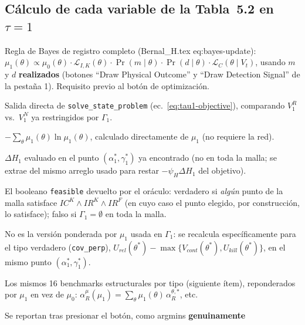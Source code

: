 \documentclass[ecta,nameyear,draft]{econsocart}
\newcommand{\pyvar}[1]{\texttt{#1}}
\begin{document}
\subsection{Cálculo de cada variable de la Tabla~5.2 en $\tau=1$}

\begin{description}[leftmargin=1.4cm, style=nextline]
\item[$\mu_1(\theta)$] Regla de Bayes de registro completo (Bernal\_H.tex eq:bayes-update):
$\mu_1(\theta)\propto\mu_0(\theta)\cdot\mathcal{L}_{I,K}(\theta)\cdot\Pr(m\mid\theta)\cdot\Pr(d\mid\theta)\cdot\mathcal{L}_{C}(\theta\mid V_t)$,
usando $m$ y $d$ \textbf{realizados} (botones ``Draw Physical Outcome'' y ``Draw Detection
Signal'' de la pestaña 1). Requisito previo al botón de optimización.\label{sec:bayes-mu1}
\item[$a_1^{S\ast},\ \alpha_1^\ast,\ \gamma_1^\ast$] Salida directa de \pyvar{solve\_state\_problem}
(ec.~\ref{eq:tau1-objective}), comparando $V_1^R$ vs.\ $V_1^N$ ya restringidos por $\Gamma_1$.
\item[$H(\mu_1)$] $-\sum_\theta\mu_1(\theta)\ln\mu_1(\theta)$, calculado directamente de $\mu_1$
(no requiere la red).
\item[$\Delta H$ Estado ($\tau=1$)] $\Delta H_1$ evaluado en el punto $(\alpha_1^\ast,\gamma_1^\ast)$
ya encontrado (no en toda la malla; se extrae del mismo arreglo usado para restar $-\psi_H\Delta H_1$
del objetivo).
\item[$\Gamma_t(\mu_t)$ bajo EV ($\tau=1$)] El booleano \pyvar{feasible} devuelto por el
oráculo: verdadero si \emph{algún} punto de la malla satisface $IC^K\wedge IR^K\wedge IR^F$
(en cuyo caso el punto elegido, por construcción, lo satisface); falso si $\Gamma_1=\emptyset$
en toda la malla.
\item[$IR^K(\theta_K)$ tipo verdadero ($\tau=1$)] No es la versión ponderada por $\mu_1$ usada
en $\Gamma_1$: se recalcula específicamente para el tipo verdadero (\pyvar{cov\_perp}),
$U_{rel}(\theta^\ast)-\max\{V_{cont}(\theta^\ast),U_{kill}(\theta^\ast)\}$, en el mismo punto
$(\alpha_1^\ast,\gamma_1^\ast)$.
\item[$\alpha_R^\mu,\gamma_R^\mu,\alpha_N^\mu,\gamma_N^\mu$ ($\tau=1$)] Los mismos 16 benchmarks
estructurales por tipo (siguiente ítem), reponderados por $\mu_1$ en vez de $\mu_0$:
$\alpha_R^\mu(\mu_1)=\sum_\theta\mu_1(\theta)\,\alpha_R^{\theta,\ast}$, etc.
\item[$\gamma_R^{\theta,\ast},\alpha_R^{\theta,\ast},\gamma_N^{\theta,\ast},\alpha_N^{\theta,\ast}$
(16 filas, $\tau=1$)] Se reportan tras presionar el botón, como argmins \textbf{genuinamente
}
\end{description}
\end{document}
